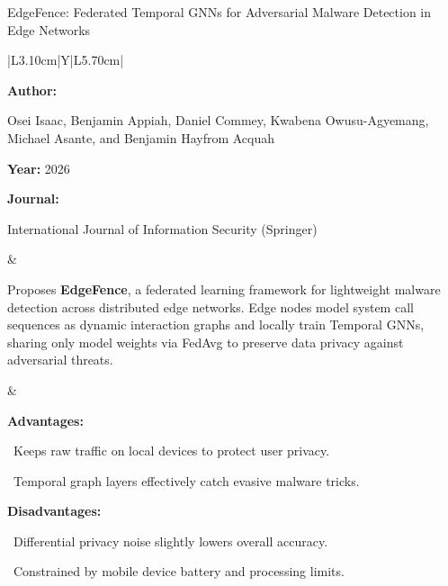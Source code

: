 \begin{frame}[t]{EdgeFence: Federated Temporal GNNs for Adversarial Malware Detection in Edge Networks}
\vspace{-0.30em}
{\footnotesize\setlength{\tabcolsep}{3.5pt}\renewcommand{\arraystretch}{1.10}
\begin{tabularx}{\textwidth}{|L{3.10cm}|Y|L{5.70cm}|}
\hline\lrhdr\hline
\begin{minipage}[t]{\linewidth}\fontsize{7.2pt}{9.2pt}\raggedright\selectfont
\textbf{Author:}\par
Osei Isaac, Benjamin Appiah, Daniel Commey, Kwabena Owusu-Agyemang, Michael Asante, and Benjamin Hayfrom Acquah\par\vspace{4pt}
\textbf{Year:} 2026\par\vspace{4pt}
\textbf{Journal:}\par
International Journal of Information Security (Springer)\par\vspace{4pt}
\end{minipage}
&
\begin{minipage}[t]{\linewidth}\fontsize{7.2pt}{9.2pt}\raggedright\selectfont
Proposes \textbf{EdgeFence}, a federated learning framework for lightweight malware detection across distributed edge networks. Edge nodes model system call sequences as dynamic interaction graphs and locally train Temporal GNNs, sharing only model weights via FedAvg to preserve data privacy against adversarial threats.\par\vspace{4pt}
\end{minipage}
&
\begin{minipage}[t]{\linewidth}\fontsize{7.2pt}{9.0pt}\raggedright\selectfont
\textcolor{strengthGreen}{\textbf{Advantages:}}\par\vspace{1.5pt}
\textbullet~Keeps raw traffic on local devices to protect user privacy.\par\vspace{2.0pt}\textbullet~Temporal graph layers effectively catch evasive malware tricks.\par\vspace{4.0pt}
\textcolor{limitRed}{\textbf{Disadvantages:}}\par\vspace{1.5pt}
\textbullet~Differential privacy noise slightly lowers overall accuracy.\par\vspace{2.0pt}\textbullet~Constrained by mobile device battery and processing limits.\par\vspace{4pt}
\end{minipage} \\\hline
\end{tabularx}}
\end{frame}

